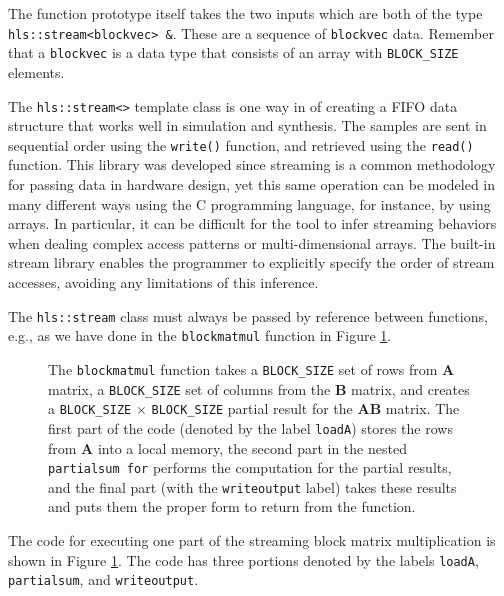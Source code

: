 The function prototype itself takes the two inputs which are both of the type \lstinline{hls::stream<blockvec> &}. These are a sequence of \lstinline{blockvec} data. Remember that a \lstinline{blockvec} is a data type that consists of an array with \lstinline{BLOCK_SIZE} elements. 

The \lstinline{hls::stream<>} template class is one way in \VHLS of creating a FIFO data structure that works well in simulation and synthesis. The samples are sent in sequential order using the \lstinline{write()} function, and retrieved using the \lstinline{read()} function. This library was developed since streaming is a common methodology for passing data in hardware design, yet this same operation can be modeled in many different ways using the C programming language, for instance, by using arrays. In particular, it can be difficult for the \VHLS tool to infer streaming behaviors when dealing complex access patterns or multi-dimensional arrays. The built-in stream library enables the programmer to explicitly specify the order of stream accesses, avoiding any limitations of this inference. 

\begin{aside}
The \lstinline{hls::stream} class must always be passed by reference between functions, e.g., as we have done in the \lstinline{blockmatmul} function in Figure \ref{fig:block_mm}.
\end{aside}

\begin{figure}

\caption{  The \lstinline{blockmatmul} function takes a \lstinline{BLOCK_SIZE} set of rows from $\mathbf{A}$ matrix, a \lstinline{BLOCK_SIZE} set of columns from the $\mathbf{B}$ matrix, and creates a \lstinline{BLOCK_SIZE} $\times$ \lstinline{BLOCK_SIZE} partial result for the $\mathbf{AB}$ matrix. The first part of the code (denoted by the label \lstinline{loadA}) stores the rows from $\mathbf{A}$ into a local memory, the second part in the nested \lstinline{partialsum for} performs the computation for the partial results, and the final part (with the \lstinline{writeoutput} label) takes these results and puts them the proper form to return from the function.}
\label{fig:block_mm}
\end{figure}

The code for executing one part of the streaming block matrix multiplication is shown in Figure \ref{fig:block_mm}. The code has three portions denoted by the labels \lstinline{loadA}, \lstinline{partialsum}, and \lstinline{writeoutput}. 

